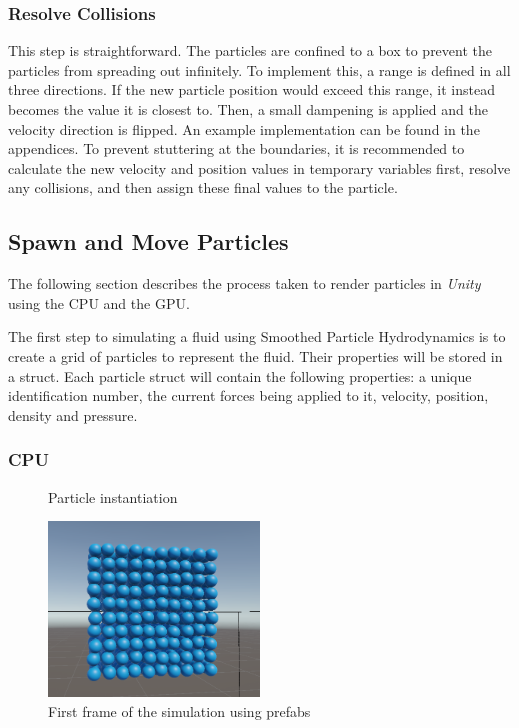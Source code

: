 \documentclass[12pt]{article}
\newcommand{\wideimage}[2][]{%
  \makebox[\textwidth][c]{\texttt{[image: \#2]}}%
}
\begin{document}
    \subsubsection{Resolve Collisions}

    This step is straightforward. The particles are confined to a box to prevent the particles from spreading out infinitely. To implement this, a range is defined in all three directions. If the new particle position would exceed this range, it instead becomes the value it is closest to. Then, a small dampening is applied and the velocity direction is flipped. An example implementation can be found in the appendices. To prevent stuttering at the boundaries, it is recommended to calculate the new velocity and position values in temporary variables first, resolve any collisions, and then assign these final values to the particle.

    \subsection{Spawn and Move Particles}

    The following section describes the process taken to render particles in \textit{Unity} using the CPU and the GPU.

    The first step to simulating a fluid using Smoothed Particle Hydrodynamics is to create a grid of particles to represent the fluid. Their properties will be stored in a struct. Each particle struct will contain the following properties: a unique identification number, the current forces being applied to it, velocity, position, density and pressure.

    \subsubsection{CPU}

    \begin{figure}[H]
        \wideimage[width=1.1\textwidth]{spawnParticles.png}
        \caption{Particle instantiation}
    \end{figure}

    \begin{figure}[H]
        \begin{center}
            \includegraphics[width=0.5\textwidth]{firstFrameCPU.png}
            \caption{First frame of the simulation using prefabs}
        \end{center}
    \end{figure}
\end{document}
